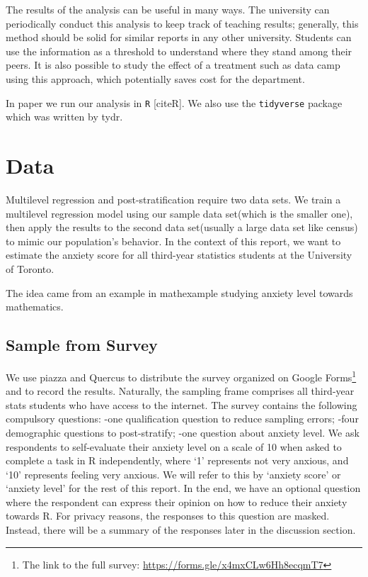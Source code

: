 \documentclass[
]{article}
\begin{document}
The results of the analysis can be useful in many ways. The university
can periodically conduct this analysis to keep track of teaching
results; generally, this method should be solid for similar reports in
any other university. Students can use the information as a threshold to
understand where they stand among their peers. It is also possible to
study the effect of a treatment such as data camp using this approach,
which potentially saves cost for the department.

In paper we run our analysis in \texttt{R} {[}citeR{]}. We also use the
\texttt{tidyverse} package which was written by tydr.

\hypertarget{data}{%
\section{Data}\label{data}}

Multilevel regression and post-stratification require two data sets. We
train a multilevel regression model using our sample data set(which is
the smaller one), then apply the results to the second data set(usually
a large data set like census) to mimic our population's behavior. In the
context of this report, we want to estimate the anxiety score for all
third-year statistics students at the University of Toronto.

The idea came from an example in mathexample studying anxiety level
towards mathematics.

\hypertarget{sample-from-survey}{%
\subsection{Sample from Survey}\label{sample-from-survey}}

We use piazza and Quercus to distribute the survey organized on Google
Forms\footnote{The link to the full survey:
  \url{https://forms.gle/x4mxCLw6Hh8ecqmT7}} and to record the results.
Naturally, the sampling frame comprises all third-year stats students
who have access to the internet. The survey contains the following
compulsory questions: -one qualification question to reduce sampling
errors; -four demographic questions to post-stratify; -one question
about anxiety level. We ask respondents to self-evaluate their anxiety
level on a scale of 10 when asked to complete a task in R independently,
where `1' represents not very anxious, and `10' represents feeling very
anxious. We will refer to this by `anxiety score' or `anxiety level' for
the rest of this report. In the end, we have an optional question where
the respondent can express their opinion on how to reduce their anxiety
towards R. For privacy reasons, the responses to this question are
masked. Instead, there will be a summary of the responses later in the
discussion section.
\end{document}
